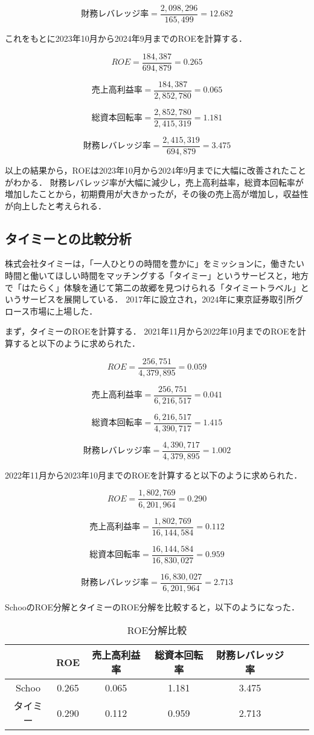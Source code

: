 \documentclass[a4paper]{ltjsarticle}
\begin{document}
\[
財務レバレッジ率 = \frac{2,098,296}{165,499} = 12.682
\]

これをもとに2023年10月から2024年9月までのROEを計算する．

\[
ROE = \frac{184,387}{694,879} = 0.265
\]

\[
売上高利益率 = \frac{184,387}{2,852,780} = 0.065
\]

\[
総資本回転率 = \frac{2,852,780}{2,415,319} = 1.181
\]

\[
財務レバレッジ率 = \frac{2,415,319}{694,879} = 3.475
\]

以上の結果から，ROEは2023年10月から2024年9月までに大幅に改善されたことがわかる．
財務レバレッジ率が大幅に減少し，売上高利益率，総資本回転率が増加したことから，初期費用が大きかったが，その後の売上高が増加し，収益性が向上したと考えられる．

\subsection{タイミーとの比較分析}
株式会社タイミーは，「一人ひとりの時間を豊かに」をミッションに，働きたい時間と働いてほしい時間をマッチングする「タイミー」というサービスと，地方で「はたらく」体験を通じて第二の故郷を見つけられる「タイミートラベル」というサービスを展開している．
2017年に設立され，2024年に東京証券取引所グロース市場に上場した．

まず，タイミーのROEを計算する．
2021年11月から2022年10月までのROEを計算すると以下のように求められた．

\[
ROE = \frac{256,751}{4,379,895} = 0.059
\]

\[
売上高利益率 = \frac{256,751}{6,216,517} = 0.041
\]

\[
総資本回転率 = \frac{6,216,517}{4,390,717} = 1.415
\]

\[
財務レバレッジ率 = \frac{4,390,717}{4,379,895} = 1.002
\]

2022年11月から2023年10月までのROEを計算すると以下のように求められた．

\[
ROE = \frac{1,802,769}{6,201,964} = 0.290
\]

\[
売上高利益率 = \frac{1,802,769}{16,144,584} = 0.112
\]

\[
総資本回転率 = \frac{16,144,584}{16,830,027} = 0.959
\]

\[
財務レバレッジ率 = \frac{16,830,027}{6,201,964} = 2.713
\]

SchooのROE分解とタイミーのROE分解を比較すると，以下のようになった．
\begin{table}[H]
  \begin{center}
    \caption{ROE分解比較}
    \begin{tabular}{|c|c|c|c|c|c|c|} \hline
      & ROE & 売上高利益率 & 総資本回転率 & 財務レバレッジ率 \\ \hline
      Schoo & 0.265 & 0.065 & 1.181 & 3.475 \\ \hline
      タイミー & 0.290 & 0.112 & 0.959 & 2.713 \\ \hline
    \end{tabular}
  \end{center}
\end{table}
\end{document}
